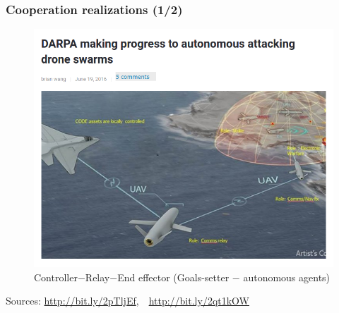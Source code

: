 \begin{frame} %
  \frametitle{Cooperation realizations (1/2)}

\begin{figure}[H]
  \includegraphics[scale=0.25]{figures/darpa_relay.png}
  \caption{Controller$-$Relay$-$End effector (Goals-setter $-$ autonomous agents)}
  \label{im:darpa_relay_1}
\end{figure}

Sources: \url{http://bit.ly/2pTljEf},\ \ \url{http://bit.ly/2qt1kOW}


\end{frame} %
